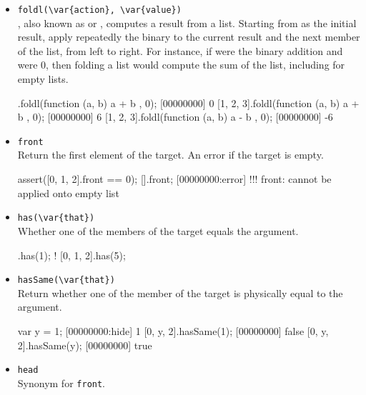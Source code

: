 \begin{itemize}
\item \lstinline|foldl(\var{action}, \var{value})|\\
  ,
  also known as  or , computes a result
  from a list.  Starting from  as the initial result, apply
  repeatedly the binary  to the current result and the
  next member of the list, from left to right.  For instance, if
   were the binary addition and  were 0, then
  folding a list would compute the sum of the list, including for
  empty lists.

\begin{urbiscript}[firstnumber=last]
[].foldl(function (a, b) { a + b }, 0);
[00000000] 0
[1, 2, 3].foldl(function (a, b) { a + b }, 0);
[00000000] 6
[1, 2, 3].foldl(function (a, b) { a - b }, 0);
[00000000] -6
\end{urbiscript}

\item \lstinline|front|\\
  Return the first element of the target. An error if the target is
  empty.

\begin{urbiscript}[firstnumber=last]
assert([0, 1, 2].front == 0);
[].front;
[00000000:error] !!! front: cannot be applied onto empty list
\end{urbiscript}

\item \lstinline|has(\var{that})|\\
  Whether one of the members of the target equals the argument.

\begin{urbiassert}[firstnumber=last]
[0, 1, 2].has(1);
! [0, 1, 2].has(5);
\end{urbiassert}

\item \lstinline|hasSame(\var{that})|\\
  Return whether one of the member of the target is physically equal
  to the argument.

\begin{urbiscript}[firstnumber=last]
var y = 1;
[00000000:hide] 1
[0, y, 2].hasSame(1);
[00000000] false
[0, y, 2].hasSame(y);
[00000000] true
\end{urbiscript}

\item \lstinline|head|\\
  Synonym for \lstinline|front|.


\end{itemize}
